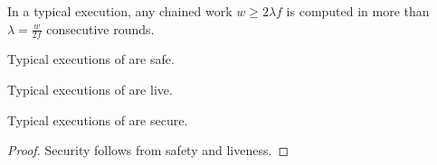 

\begin{conjecture} \label{lem:patience}
  In a typical execution, any chained work $w \geq 2 \lambda f$ is computed
  in more than $\lambda = \frac{w}{2 f}$ consecutive rounds.
\end{conjecture}

\begin{conjecture}
  Typical executions of \poem are safe.
\end{conjecture}

\begin{conjecture}
  Typical executions of \poem are live.
\end{conjecture}

\begin{corollary}
  Typical executions of \poem are secure.
\end{corollary}
\begin{proof}
  Security follows from safety and liveness.
  \Qed
\end{proof}
